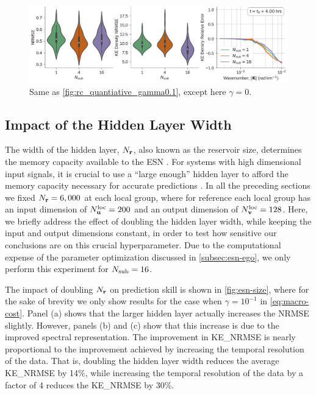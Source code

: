 \begin{figure}
    \centering
    \includegraphics[width=\textwidth]{../figures/rc_all_gamma0.0.pdf}
    \caption{Same as \cref{fig:rc_quantiative_gamma0.1}, except here $\gamma=0$.}
    \label{fig:rc_quantiative_gamma0.0}
\end{figure}

\subsection{Impact of the Hidden Layer Width}
\label{subsec:esn-size}

The width of the hidden layer, $N_{\mathbf{r}}$, also known as the reservoir size, determines the
memory capacity available to the ESN
\citep{jaeger_echo_2001,lukosevicius_practical_2012}.
For systems with high dimensional input signals, it is crucial to use a ``large
enough'' hidden layer to afford the memory capacity necessary for accurate
predictions \citep{hermans_memory_2010}.
In all the preceding sections we fixed $N_{\mathbf{r}}=6,000$ at each local group,
where for reference each local group has an input dimension of
$N_{\mathbf{u}}^\text{loc}=200$ and an output dimension of $N_{\mathbf{v}}^\text{loc}=128$.
Here, we briefly address the effect of doubling the hidden layer width,
while keeping the input and output dimensions constant, in order to test how
sensitive our conclusions are on this crucial hyperparameter.
Due to the computational expense of the parameter optimization discussed in
\cref{subsec:esn-ego}, we only perform this experiment for $N_\text{sub}=16$.

The impact of doubling $N_{\mathbf{r}}$ on prediction skill is shown in
\cref{fig:esn-size}, where for the sake of brevity we only show results for the
case when $\gamma=10^{-1}$ in \cref{eq:macro-cost}.
Panel (a) shows that the larger hidden layer actually increases the NRMSE slightly.
However, panels (b) and (c) show that this increase is due to the improved
spectral representation.
The improvement in KE\_NRMSE is nearly proportional to the improvement achieved by increasing
the temporal resolution of the data.
That is, doubling the hidden layer width reduces the average KE\_NRMSE by 14\%,
while increasing the temporal resolution of the data by a factor of 4 reduces
the KE\_NRMSE by 30\%.

